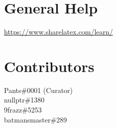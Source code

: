 \documentclass[12pt,a4paper]{article}
\begin{document}
\section{General Help}

\url{https://www.sharelatex.com/learn/}





\clearpage
\appendix


\section{Contributors}
\label{appendix:contributors}
Pants\#0001 (Curator) \\
nullptr\#1380 \\
9frazz\#5253 \\
batmansmaster\#289 \\
\end{document}

